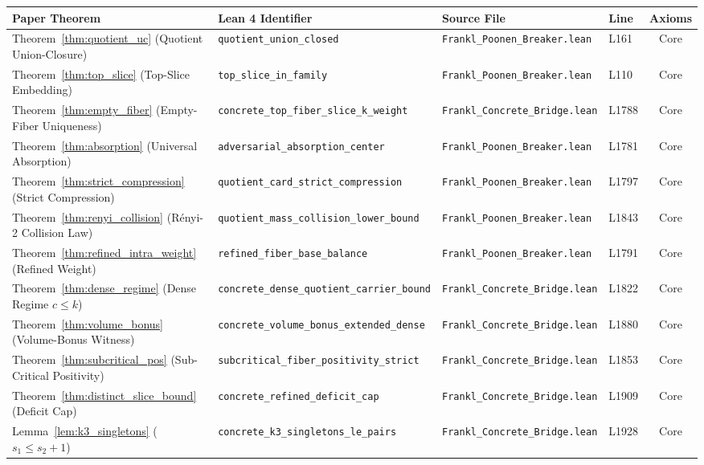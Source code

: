 \documentclass[11pt,a4paper]{article}
\theoremstyle{plain}
\theoremstyle{definition}
\theoremstyle{remark}
\begin{document}
\begin{table}[h!]
\centering
\small
\begin{tabular}{@{}llllc@{}}
\toprule
\textbf{Paper Theorem} & \textbf{Lean 4 Identifier} & \textbf{Source File} & \textbf{Line} & \textbf{Axioms} \\
\midrule
Theorem~\ref{thm:quotient_uc} (Quotient Union-Closure) & \texttt{quotient\_union\_closed} & \texttt{Frankl\_Poonen\_Breaker.lean} & L161 & Core \\
Theorem~\ref{thm:top_slice} (Top-Slice Embedding) & \texttt{top\_slice\_in\_family} & \texttt{Frankl\_Poonen\_Breaker.lean} & L110 & Core \\
Theorem~\ref{thm:empty_fiber} (Empty-Fiber Uniqueness) & \texttt{concrete\_top\_fiber\_slice\_k\_weight} & \texttt{Frankl\_Concrete\_Bridge.lean} & L1788 & Core \\
Theorem~\ref{thm:absorption} (Universal Absorption) & \texttt{adversarial\_absorption\_center} & \texttt{Frankl\_Poonen\_Breaker.lean} & L1781 & Core \\
Theorem~\ref{thm:strict_compression} (Strict Compression) & \texttt{quotient\_card\_strict\_compression} & \texttt{Frankl\_Poonen\_Breaker.lean} & L1797 & Core \\
Theorem~\ref{thm:renyi_collision} (Rényi-2 Collision Law) & \texttt{quotient\_mass\_collision\_lower\_bound} & \texttt{Frankl\_Poonen\_Breaker.lean} & L1843 & Core \\
Theorem~\ref{thm:refined_intra_weight} (Refined Weight) & \texttt{refined\_fiber\_base\_balance} & \texttt{Frankl\_Poonen\_Breaker.lean} & L1791 & Core \\
Theorem~\ref{thm:dense_regime} (Dense Regime $c \le k$) & \texttt{concrete\_dense\_quotient\_carrier\_bound} & \texttt{Frankl\_Concrete\_Bridge.lean} & L1822 & Core \\
Theorem~\ref{thm:volume_bonus} (Volume-Bonus Witness) & \texttt{concrete\_volume\_bonus\_extended\_dense} & \texttt{Frankl\_Concrete\_Bridge.lean} & L1880 & Core \\
Theorem~\ref{thm:subcritical_pos} (Sub-Critical Positivity) & \texttt{subcritical\_fiber\_positivity\_strict} & \texttt{Frankl\_Concrete\_Bridge.lean} & L1853 & Core \\
Theorem~\ref{thm:distinct_slice_bound} (Deficit Cap) & \texttt{concrete\_refined\_deficit\_cap} & \texttt{Frankl\_Concrete\_Bridge.lean} & L1909 & Core \\
Lemma~\ref{lem:k3_singletons} ($s_1 \le s_2 + 1$) & \texttt{concrete\_k3\_singletons\_le\_pairs} & \texttt{Frankl\_Concrete\_Bridge.lean} & L1928 & Core \\

\end{tabular}
\end{table}
\end{document}
